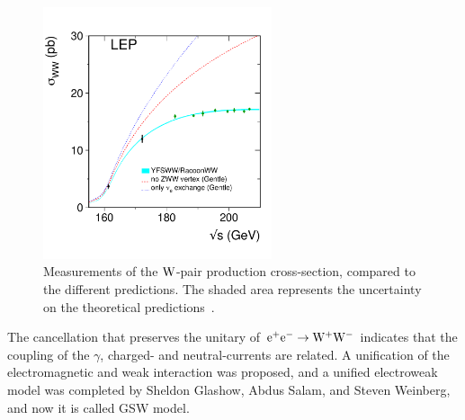 \begin{figure}[!ht]
  \begin{center}  
    \includegraphics[width=0.6\textwidth]{Fig/4f_wwxsec_nocouplings_2008}
    \caption{Measurements of the $\mathrm{W}$-pair production cross-section, compared to the different predictions. The shaded area represents the uncertainty on the theoretical predictions~\cite{Schael:2013ita}. \label{fig:eeWWUnitarity}} 
  \end{center}
\end{figure} 

The cancellation that preserves the unitary of $\mathrm{e}^+\mathrm{e}^-\to\mathrm{W}^{+}\mathrm{W}^{-}$ indicates that the coupling of the $\gamma$, charged- and neutral-currents are related. A unification of the electromagnetic and weak interaction was proposed, and a unified electroweak model was completed by Sheldon Glashow, Abdus Salam, and Steven Weinberg, and now it is called GSW model.

